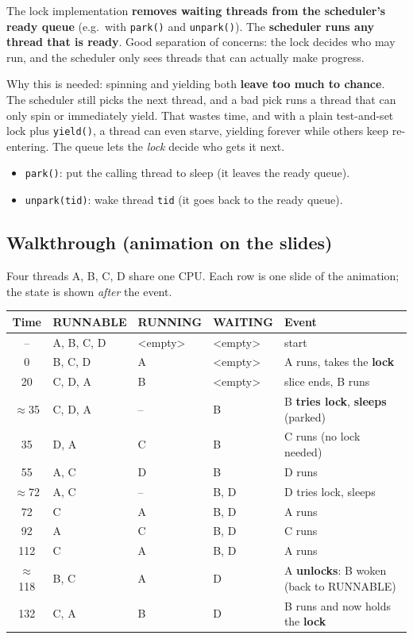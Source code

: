 \documentclass[11pt,a4paper]{article}
\begin{document}
The lock implementation \textbf{removes waiting threads from the scheduler's
ready queue} (e.g.\ with \texttt{park()} and \texttt{unpark()}). The
\textbf{scheduler runs any thread that is ready}. Good separation of
concerns: the lock decides who may run, and the scheduler only sees threads
that can actually make progress.

Why this is needed: spinning and yielding both \textbf{leave too much to
chance}. The scheduler still picks the next thread, and a bad pick runs a
thread that can only spin or immediately yield. That wastes time, and with
a plain test-and-set lock plus \texttt{yield()}, a thread can even starve,
yielding forever while others keep re-entering. The queue lets the
\emph{lock} decide who gets it next.

\begin{itemize}
  \item \texttt{park()}: put the calling thread to sleep (it leaves the
        ready queue).
  \item \texttt{unpark(tid)}: wake thread \texttt{tid} (it goes back to the
        ready queue).
\end{itemize}

\subsection{Walkthrough (animation on the slides)}

Four threads A, B, C, D share one CPU. Each row is one slide of the
animation; the state is shown \emph{after} the event.

\begin{center}
\renewcommand{\arraystretch}{1.08}
\small
\begin{tabular}{@{}clllp{5.4cm}@{}}
  \toprule
  \textbf{Time} & \textbf{RUNNABLE} & \textbf{RUNNING} & \textbf{WAITING} & \textbf{Event} \\
  \midrule
  --       & A, B, C, D & \textless empty\textgreater & \textless empty\textgreater & start \\
  0        & B, C, D & A & \textless empty\textgreater & A runs, takes the \textbf{lock} \\
  20       & C, D, A & B & \textless empty\textgreater & slice ends, B runs \\
  \(\approx\)35 & C, D, A & -- & B & B \textbf{tries lock}, \textbf{sleeps} (parked) \\
  35       & D, A & C & B & C runs (no lock needed) \\
  55       & A, C & D & B & D runs \\
  \(\approx\)72 & A, C & -- & B, D & D tries lock, sleeps \\
  72       & C & A & B, D & A runs \\
  92       & A & C & B, D & C runs \\
  112      & C & A & B, D & A runs \\
  \(\approx\)118 & B, C & A & D & A \textbf{unlocks}: B woken (back to RUNNABLE) \\
  132      & C, A & B & D & B runs and now holds the \textbf{lock} \\
  \bottomrule
\end{tabular}
\end{center}
\end{document}
